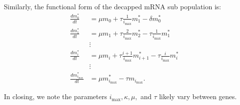 \documentclass[10pt,letterpaper]{article}
\newcommand{\imax}{\ensuremath{{i_{\max}}}\xspace}
\begin{document}
Similarly, the functional form of the decapped mRNA sub population is: 
\begin{align}\label{eq:Decapped_ODE}
\frac{dm_{0}^{*}}{dt} &= \mu m_{0}+ \tau \frac{1}{\imax}m_{1}^{*}-\delta m_{0}^{*} \nonumber \\
\frac{dm_{1}^{*}}{dt} &= \mu m_{1}+ \tau \frac{2}{\imax}m_{2}^{*}-\tau \frac{1}{\imax} m_{1}^{*} \nonumber \\
& \vdots & \nonumber \\
\frac{dm_{i}^{*}}{dt} &= \mu m_{i}+ \tau \frac{i+1}{\imax}m_{i+1}^{*}-\tau \frac{i}{\imax} m_{i}^{*} \nonumber \\
& \vdots & \nonumber \\
\frac{dm_{\imax}^{*}}{dt} &= \mu m_{\imax}^{*}- \tau m_{\imax}. 
\end{align}

In closing, we note the parameters $\imax, \kappa, \mu,$ and $\tau$ likely vary between genes.
\end{document}
